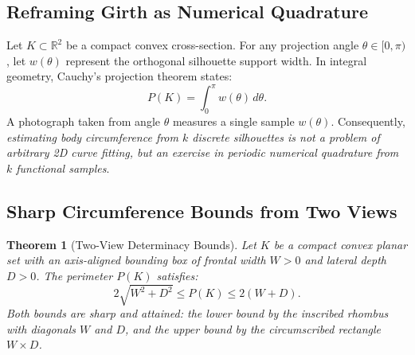 \documentclass[journal]{IEEEtran}
\newtheorem{theorem}{Theorem}
\begin{document}
\subsection{Reframing Girth as Numerical Quadrature}
Let $K \subset \mathbb{R}^2$ be a compact convex cross-section. For any projection angle $\theta \in [0, \pi)$, let $w(\theta)$ represent the orthogonal silhouette support width. In integral geometry, Cauchy's projection theorem \cite{santalo2004integral} states:
\begin{equation}
P(K) = \int_0^\pi w(\theta)\,d\theta.
\label{eq:cauchy_integral}
\end{equation}
A photograph taken from angle $\theta$ measures a single sample $w(\theta)$. Consequently, \textit{estimating body circumference from $k$ discrete silhouettes is not a problem of arbitrary 2D curve fitting, but an exercise in periodic numerical quadrature from $k$ functional samples}.

\subsection{Sharp Circumference Bounds from Two Views}
\begin{theorem}[Two-View Determinacy Bounds]
\label{thm:two_view_bounds}
Let $K$ be a compact convex planar set with an axis-aligned bounding box of frontal width $W > 0$ and lateral depth $D > 0$. The perimeter $P(K)$ satisfies:
\begin{equation}
2\sqrt{W^2 + D^2} \le P(K) \le 2(W + D).
\label{eq:sharp_bounds}
\end{equation}
Both bounds are sharp and attained: the lower bound by the inscribed rhombus with diagonals $W$ and $D$, and the upper bound by the circumscribed rectangle $W \times D$.
\end{theorem}
\end{document}
